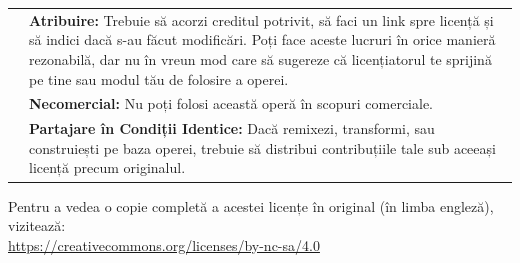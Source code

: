 \documentclass[class=roalgo, crop=false]{standalone}
\begin{document}
\noindent\ignorespaces  \begin{tabularx}{\textwidth}{p{\widthof{\ccAttribution}+2mm}X}
	\ccAttribution & \textbf{Atribuire:} Trebuie să acorzi creditul potrivit, să faci un link
	spre licență și să indici dacă s-au făcut modificări. Poți face aceste lucruri
	în orice manieră rezonabilă, dar nu în vreun mod care să sugereze că
	licențiatorul te sprijină pe tine sau modul tău de folosire a operei.\\
	\ccNonCommercialEU & \textbf{Necomercial:} Nu poți
	folosi această operă în scopuri comerciale.\\
	\ccShareAlike & \textbf{Partajare în Condiții
		Identice:} Dacă remixezi, transformi, sau construiești pe baza operei, trebuie
	să distribui contribuțiile tale sub aceeași licență precum originalul.
\end{tabularx}

\vspace{3mm}

\noindent\ignorespaces  Pentru a vedea o copie completă a acestei licențe în original (în limba engleză), vizitează:\\[-3mm]\href{https://creativecommons.org/licenses/by-nc-sa/4.0/}{https://creativecommons.org/licenses/by-nc-sa/4.0}
\endgroup

\restoregeometry
\end{document}
